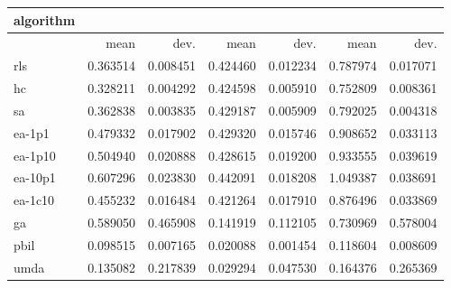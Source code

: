 \begin{tabular}{@{}l*{6}{>{{}}N{1}{2}}@{}}
\toprule
{algorithm} &  &  &  \\
\midrule
& {mean} & {dev.} & {mean} & {dev.} & {mean} & {dev.} \\
\midrule
rls & 0.363514 & 0.008451 & 0.424460 & 0.012234 & 0.787974 & 0.017071 \\
 hc & 0.328211 & 0.004292 & 0.424598 & 0.005910 & 0.752809 & 0.008361 \\
 sa & 0.362838 & 0.003835 & 0.429187 & 0.005909 & 0.792025 & 0.004318 \\
 ea-1p1 & 0.479332 & 0.017902 & 0.429320 & 0.015746 & 0.908652 & 0.033113 \\
 ea-1p10 & 0.504940 & 0.020888 & 0.428615 & 0.019200 & 0.933555 & 0.039619 \\
 ea-10p1 & 0.607296 & 0.023830 & 0.442091 & 0.018208 & 1.049387 & 0.038691 \\
 ea-1c10 & 0.455232 & 0.016484 & 0.421264 & 0.017910 & 0.876496 & 0.033869 \\
 ga & 0.589050 & 0.465908 & 0.141919 & 0.112105 & 0.730969 & 0.578004 \\
 pbil & 0.098515 & 0.007165 & 0.020088 & 0.001454 & 0.118604 & 0.008609 \\
 umda & 0.135082 & 0.217839 & 0.029294 & 0.047530 & 0.164376 & 0.265369 \\
 \bottomrule
\end{tabular}
